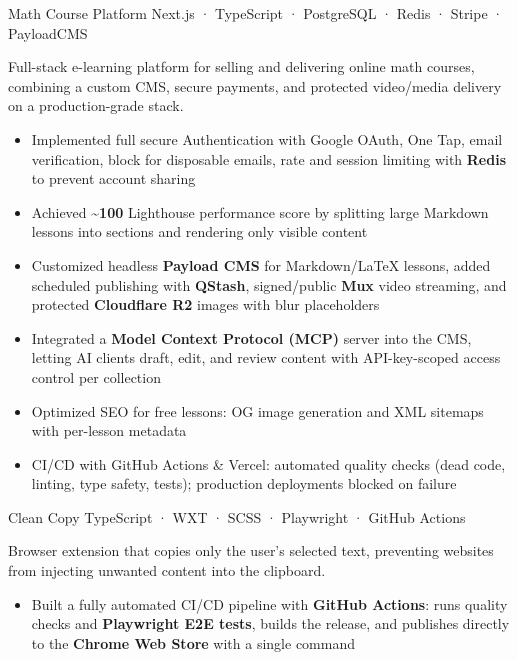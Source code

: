 \documentclass[10pt, a4paper]{article}
\begin{document}
\project%
  {Math Course Platform}%
  {Next.js · TypeScript · PostgreSQL · Redis · Stripe · PayloadCMS}%
  {%
    \dotsep%
  }

Full-stack e-learning platform for selling and delivering online math courses, combining a
custom CMS, secure payments, and protected video/media delivery on a production-grade stack.

\begin{itemize}
  \item Implemented full secure Authentication with Google OAuth, One Tap, email verification, block for disposable emails, rate and session limiting with \textbf{Redis} to prevent account sharing
  \item Achieved \textbf{\textasciitilde100} Lighthouse performance score by splitting large Markdown lessons into sections and rendering only visible content
  \item Customized headless \textbf{Payload CMS} for Markdown/LaTeX lessons, added scheduled publishing with \textbf{QStash}, signed/public \textbf{Mux} video streaming, and protected \textbf{Cloudflare R2} images with blur placeholders
  \item Integrated a \textbf{Model Context Protocol (MCP)} server into the CMS, letting AI clients draft, edit, and review content with API-key-scoped access control per collection
  \item Optimized SEO for free lessons: OG image generation and XML sitemaps with per-lesson metadata
  \item CI/CD with GitHub Actions \& Vercel: automated quality checks (dead code, linting, type safety, tests); production deployments blocked on failure
\end{itemize}

\vspace{8pt}

\project%
  {Clean Copy}%
  {TypeScript · WXT · SCSS · Playwright · GitHub Actions}%
  {%
    \dotsep%
  }

Browser extension that copies only the user's selected text, preventing websites from injecting unwanted content into the clipboard.

\begin{itemize}
  \item Built a fully automated CI/CD pipeline with \textbf{GitHub Actions}: runs quality checks and \textbf{Playwright E2E tests}, builds the release, and publishes directly to the \textbf{Chrome Web Store} with a single command
\end{itemize}
\end{document}
